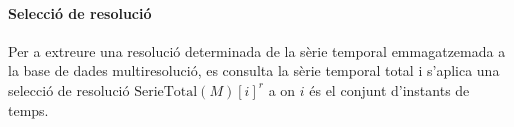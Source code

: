 \paragraph{Selecció de resolució}


Per a extreure una resolució determinada de la sèrie temporal
emmagatzemada a la base de dades multiresolució, es consulta la sèrie
temporal total i s'aplica una selecció de resolució
$\text{SerieTotal}(M)[i]^r$ a on $i$ és el conjunt d'instants de
temps.






